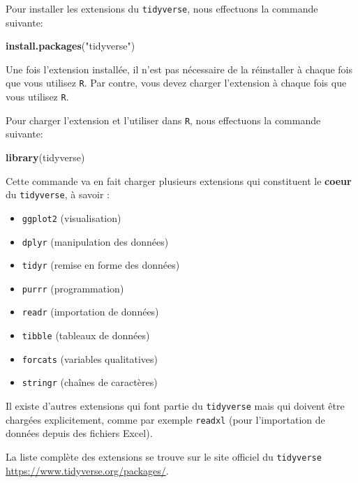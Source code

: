 \documentclass[]{book}
\newenvironment{Shaded}{\begin{snugshade}}{\end{snugshade}}
\newcommand{\KeywordTok}[1]{\textcolor[rgb]{0.13,0.29,0.53}{\textbf{#1}}}
\newcommand{\NormalTok}[1]{#1}
\newcommand{\StringTok}[1]{\textcolor[rgb]{0.31,0.60,0.02}{#1}}
\providecommand{\tightlist}{%
  \setlength{\itemsep}{0pt}\setlength{\parskip}{0pt}}
\theoremstyle{definition}
\theoremstyle{definition}
\theoremstyle{definition}
\theoremstyle{remark}
\begin{document}
Pour installer les extensions du \texttt{tidyverse}, nous effectuons la
commande suivante:

\begin{Shaded}
\begin{Highlighting}[]
\KeywordTok{install.packages}\NormalTok{(}\StringTok{"tidyverse"}\NormalTok{)}
\end{Highlighting}
\end{Shaded}

Une fois l'extension installée, il n'est pas nécessaire de la
réinstaller à chaque fois que vous utilisez \texttt{R}. Par contre, vous
devez charger l'extension à chaque fois que vous utilisez \texttt{R}.

Pour charger l'extension et l'utiliser dans \texttt{R}, nous effectuons
la commande suivante:

\begin{Shaded}
\begin{Highlighting}[]
\KeywordTok{library}\NormalTok{(tidyverse)}
\end{Highlighting}
\end{Shaded}

Cette commande va en fait charger plusieurs extensions qui constituent
le \textbf{coeur} du \texttt{tidyverse}, à savoir :

\begin{itemize}
\tightlist
\item
  \texttt{ggplot2} (visualisation)
\item
  \texttt{dplyr} (manipulation des données)
\item
  \texttt{tidyr} (remise en forme des données)
\item
  \texttt{purrr} (programmation)
\item
  \texttt{readr} (importation de données)
\item
  \texttt{tibble} (tableaux de données)
\item
  \texttt{forcats} (variables qualitatives)
\item
  \texttt{stringr} (chaînes de caractères)
\end{itemize}

Il existe d'autres extensions qui font partie du \texttt{tidyverse} mais
qui doivent être chargées explicitement, comme par exemple
\texttt{readxl} (pour l'importation de données depuis des fichiers
Excel).

La liste complète des extensions se trouve sur le site officiel du
\texttt{tidyverse} \url{https://www.tidyverse.org/packages/}.
\end{document}
